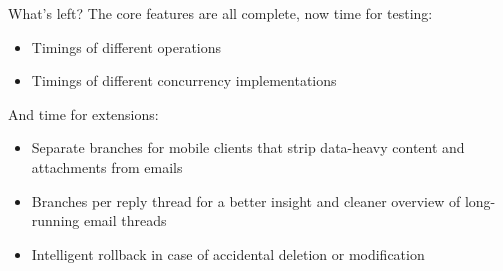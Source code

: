 \documentclass{beamer}
\begin{document}
  \begin{frame}{What's left?}
    The core features are all complete, now time for testing:
    \begin{itemize}
      \item Timings of different operations
      \item Timings of different concurrency implementations
    \end{itemize}

    And time for extensions:
    \begin{itemize}
      \item Separate branches for mobile clients that strip data-heavy content and attachments from emails
      \item Branches per reply thread for a better insight and cleaner overview of long-running email threads
      \item Intelligent rollback in case of accidental deletion or modification
    \end{itemize}
  \end{frame}
\end{document}
